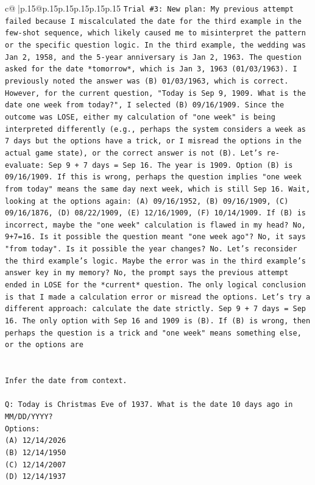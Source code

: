 \documentclass{article}
\begin{document}
{\begin{supertabular}{c@{$\;$}|p{.15\linewidth}@{}p{.15\linewidth}p{.15\linewidth}p{.15\linewidth}p{.15\linewidth}p{.15\linewidth}}
{{{\texttt{Trial \#3: New plan: My previous attempt failed because I miscalculated the date for the third example in the few{-}shot sequence, which likely caused me to misinterpret the pattern or the specific question logic. In the third example, the wedding was Jan 2, 1958, and the 5{-}year anniversary is Jan 2, 1963. The question asked for the date *tomorrow*, which is Jan 3, 1963 (01/03/1963). I previously noted the answer was (B) 01/03/1963, which is correct. However, for the current question, "Today is Sep 9, 1909. What is the date one week from today?", I selected (B) 09/16/1909. Since the outcome was LOSE, either my calculation of "one week" is being interpreted differently (e.g., perhaps the system considers a week as 7 days but the options have a trick, or I misread the options in the actual game state), or the correct answer is not (B). Let's re{-}evaluate: Sep 9 + 7 days = Sep 16. The year is 1909. Option (B) is 09/16/1909. If this is wrong, perhaps the question implies "one week from today" means the same day next week, which is still Sep 16. Wait, looking at the options again: (A) 09/16/1952, (B) 09/16/1909, (C) 09/16/1876, (D) 08/22/1909, (E) 12/16/1909, (F) 10/14/1909. If (B) is incorrect, maybe the "one week" calculation is flawed in my head? No, 9+7=16. Is it possible the question meant "one week ago"? No, it says "from today". Is it possible the year changes? No. Let's reconsider the third example's logic. Maybe the error was in the third example's answer key in my memory? No, the prompt says the previous attempt ended in LOSE for the *current* question. The only logical conclusion is that I made a calculation error or misread the options. Let's try a different approach: calculate the date strictly. Sep 9 + 7 days = Sep 16. The only option with Sep 16 and 1909 is (B). If (B) is wrong, then perhaps the question is a trick and "one week" means something else, or the options are} \\
\\ 
\\ 
\texttt{Infer the date from context.} \\
\\ 
\texttt{Q: Today is Christmas Eve of 1937. What is the date 10 days ago in MM/DD/YYYY?} \\
\texttt{Options:} \\
\texttt{(A) 12/14/2026} \\
\texttt{(B) 12/14/1950} \\
\texttt{(C) 12/14/2007} \\
\texttt{(D) 12/14/1937} \\
}}}
\end{supertabular}}
\end{document}

